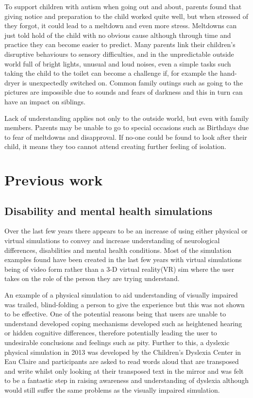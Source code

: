\documentclass[11pt]{report}
\begin{document}
To support children with autism when going out and about, parents found that giving notice and preparation to the child worked quite well, but when stressed of they forgot, it could lead to a meltdown and even more stress\cite{meltdowns_goingout}. Meltdowns can just told hold of the child with no obvious cause although through time and practice they can become easier to predict. Many parents link their children's disruptive behaviours to sensory difficulties, and in the unpredictable outside world full of bright lights, unusual and loud noises, even a simple tasks such taking the child to the toilet can become a challenge if, for example the hand-dryer is unexpectedly switched on\cite{meltdowns_goingout}. Common family outings such as going to the pictures are impossible due to sounds and fears of darkness and this in turn can have an impact on siblings.  

Lack of understanding applies not only to the outside world, but even with family members\cite{meltdowns_goingout}. Parents may be unable to go to special occasions such as Birthdays due to fear of meltdowns and disapproval. If no-one could be found to look after their child, it means they too cannot attend creating further feeling of isolation.

\section{Previous work}

\subsection{Disability and mental health simulations}
Over the last few years there appears to be an increase of using either physical or virtual simulations to convey and increase understanding of neurological differences, disabilities and mental health conditions. Most of the simulation examples found have been created in the last few years with virtual simulations being of video form rather than a 3-D virtual reality(VR) sim where the user takes on the role of the person they are trying understand.  

An example of a physical simulation to aid understanding of visually impaired was trailed, blind-folding a person to give the experience but this was not shown to be effective\cite{dd}. One of the potential reasons being that users are unable to understand developed coping mechanisms developed such as heightened hearing or hidden cognitive differences, therefore potentially leading the user to undesirable conclusions and feelings such as pity. Further to this, a dyslexic physical simulation in 2013 was developed by the Children’s Dyslexia Center in Eau Claire and participants are asked to read words aloud that are transposed and write whilst only looking at their transposed text in the mirror\cite{udyslexia} and was felt to be a fantastic step in raising awareness and understanding of dyslexia although would still suffer the same problems as the visually impaired simulation. 
\end{document}
